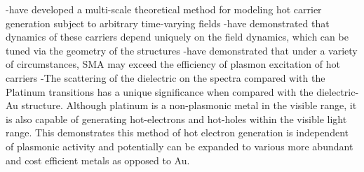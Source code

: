 \documentclass[journal=jpclcd,manuscript=article]{achemso}
\begin{document}

-have developed a multi-scale theoretical method for modeling hot carrier generation subject to arbitrary time-varying fields
-have demonstrated that dynamics of these carriers depend uniquely on the field dynamics, which can be tuned via the geometry of the structures
-have demonstrated that under a variety of circumstances, SMA may exceed the efficiency of plasmon excitation of hot carriers
-The scattering of the dielectric on the spectra compared with the Platinum transitions has a unique significance when 
compared with the dielectric-Au structure. Although platinum is a non-plasmonic metal in the visible range, it is also 
capable of generating hot-electrons and hot-holes within the visible light range. This demonstrates this method of 
hot electron generation is independent of plasmonic activity and potentially can be expanded to various more abundant and cost efficient metals as opposed to Au. 

\end{document}
